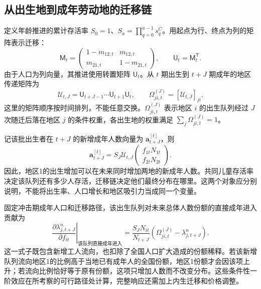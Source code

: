 \documentclass[UTF8,a4paper,zihao=-4,fontset=windows]{ctexart}
\numberwithin{equation}{section}
\begin{document}
\subsection{从出生地到成年劳动地的迁移链}
定义年龄推进的累计存活率 $S_0=1$、$S_a=\prod_{q=0}^{a-1}s^C_q$。用起点为行、终点为列的矩阵表示迁移：
\begin{equation}
 \mathsf M_t=\begin{pmatrix}1-m_{12,t}&m_{12,t}\\
 m_{21,t}&1-m_{21,t}\end{pmatrix},\qquad
 \mathsf U_t=\mathsf M_t^{\mathsf T}.
\end{equation}
由于人口为列向量，其推进使用转置矩阵 $\mathsf U_t$。从 $t$ 期出生到 $t+J$ 期成年的地区传递矩阵为
\begin{equation}
 \mathcal U_{t,J}=\mathsf U_{t+J-1}\cdots\mathsf U_{t+1}\mathsf U_t,
 \qquad\Omega_{ji,t}^{(J)}=[\mathcal U_{t,J}]_{ji}.
 \label{eq:two-region-cohort-transition}
\end{equation}
这里的矩阵顺序按时间排列，不能任意交换。$\Omega_{ji,t}^{(J)}$ 表示地区 $i$ 的出生队列经过 $J$ 次随迁后落在地区 $j$ 的条件权重，各出生地的权重满足 $\sum_j\Omega_{ji,t}^{(J)}=1$。

记该批出生者在 $t+J$ 的新增成年人数向量为 $\bm a_{t+J}^{[t]}$，则
\begin{equation}
 \bm a_{t+J}^{[t]}=S_J\mathcal U_{t,J}
 \begin{pmatrix}f_{1t}N_{1t}\\f_{2t}N_{2t}\end{pmatrix}.
 \label{eq:two-region-maturing-cohort}
\end{equation}
因此，地区1的出生增加可以在未来同时增加两地的新成年人数。共同儿童存活率决定该队列还有多少人存活，迁移链决定他们最终分布在哪里。这两个对象应分别说明，不能将出生率、人口增长和地区吸引力当成同一个变量。

固定冲击期成年人口和迁移路径，该出生队列对未来总体人数份额的直接成年进入贡献为
\begin{equation}
 \left.\frac{\partial\lambda^n_{j,t+J}}{\partial f_{it}}\right|_{\text{该队列直接成年进入}}
 =\frac{S_JN_{it}}{N_{t+J}}
 \left(\Omega_{ji,t}^{(J)}-\lambda^n_{j,t+J}\right).
 \label{eq:two-region-cohort-share-effect}
\end{equation}
这一式子既包含新增工人流向，也扣除了全国人口扩大造成的份额稀释。若该新增队列流向地区1的比例高于当地已有成年人的全国份额，地区1份额才会因该项上升；若流向比例恰好等于原有份额，这项只增加人数而不改变分布。这些条件性一阶效应在所考察的可行路径处计算，完整响应还需加上内生迁移和价格调整。
\end{document}

